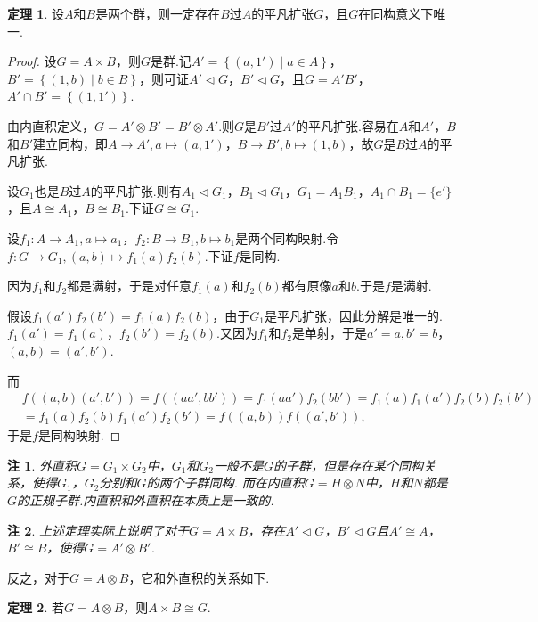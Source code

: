 \documentclass[12pt]{ctexart}
\theoremstyle{definition}
\newtheorem{theorem}{定理}[section]
\theoremstyle{plain}
\newtheorem*{remark}{注}
\begin{document}
\begin{theorem}
	设$A$和$B$是两个群，则一定存在$B$过$A$的平凡扩张$G$，且$G$在同构意义下唯一.
\end{theorem}
\begin{proof}
	设$G=A\times B$，则$G$是群.记$A'=\left\{(a,1')\mid a\in A\right\}$，$B'=\left\{(1,b)\mid b\in B\right\}$，则可证$A'\lhd G$，$B'\lhd G$，且$G=A'B'$，$A'\cap B'=\left\{(1,1')\right\}$.
	
	由内直积定义，$G=A'\otimes B'=B'\otimes A'$.则$G$是$B'$过$A'$的平凡扩张.容易在$A$和$A'$，$B$和$B'$建立同构，即$A\to A',a\mapsto(a,1')$，$B\to B',b\mapsto(1,b)$，故$G$是$B$过$A$的平凡扩张.
	
	设$G_1$也是$B$过$A$的平凡扩张.则有$A_1\lhd G_1$，$B_1\lhd G_1$，$G_1=A_1B_1$，$A_1\cap B_1=\{e'\}$，且$A\cong A_1$，$B\cong B_1$.下证$G\cong G_1$.
	
	设$f_1:A\to A_1,a\mapsto a_1$，$f_2:B\to B_1,b\mapsto b_1$是两个同构映射.令$f:G\to G_1,(a,b)\mapsto f_1(a)f_2(b)$.下证$f$是同构.
	
	因为$f_1$和$f_2$都是满射，于是对任意$f_1(a)$和$f_2(b)$都有原像$a$和$b$.于是$f$是满射.
	
	假设$f_1(a')f_2(b')=f_1(a)f_2(b)$，由于$G_1$是平凡扩张，因此分解是唯一的. $f_1(a')=f_1(a)$，$f_2(b')=f_2(b)$.又因为$f_1$和$f_2$是单射，于是$a'=a,b'=b$，$(a,b)=(a',b')$.
	
	而
	\begin{equation*}
		\begin{aligned}
			&f\left((a,b)(a',b')\right)=f\left((aa',bb')\right)=f_1(aa')f_2(bb')=f_1(a)f_1(a')f_2(b)f_2(b')\\
			&=f_1(a)f_2(b)f_1(a')f_2(b')=f\left((a,b)\right)f\left((a',b')\right),
		\end{aligned}
	\end{equation*}
	于是$f$是同构映射.
\end{proof}
\begin{remark}
	外直积$G=G_1\times G_2$中，$G_1$和$G_2$一般不是$G$的子群，但是存在某个同构关系，使得$G_1$，$G_2$分别和$G$的两个子群同构. 而在内直积$G=H\otimes N$中，$H$和$N$都是$G$的正规子群.内直积和外直积在本质上是一致的.
\end{remark}
\begin{remark}
	上述定理实际上说明了对于$G=A\times B$，存在$A'\lhd G$，$B'\lhd G$且$A'\cong A$，$B'\cong B$，使得$G=A'\otimes B'$.
\end{remark}
反之，对于$G=A\otimes B$，它和外直积的关系如下.
\begin{theorem}
	若$G=A\otimes B$，则$A\times B\cong G$.
\end{theorem}
\end{document}
